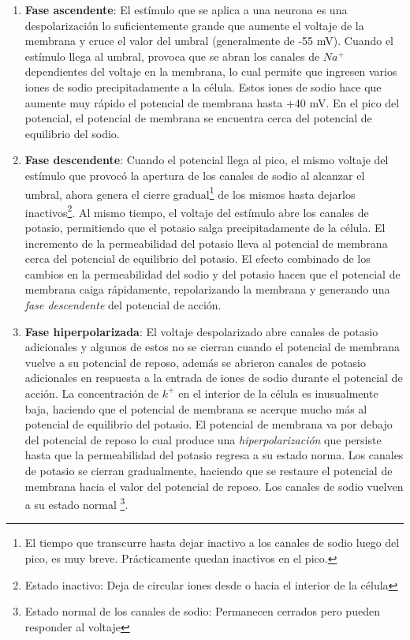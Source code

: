 \begin{enumerate}
\item \textbf{Fase ascendente}: El estímulo que se aplica a una neurona es una despolarización lo suficientemente grande que aumente el voltaje de la membrana y cruce el valor del umbral (generalmente de -55 mV). Cuando el estímulo llega al umbral, provoca que  se abran los canales de $Na^+$ dependientes del voltaje en la membrana, lo cual permite que ingresen varios iones de sodio precipitadamente a la célula. Estos iones de sodio hace que aumente muy rápido el potencial de membrana hasta +40 mV. En el pico del potencial, el potencial de membrana se encuentra cerca del potencial de equilibrio del sodio.
\item \textbf{Fase descendente}: Cuando el potencial llega al pico, el mismo voltaje del estímulo que provocó la apertura de los canales de sodio al alcanzar el umbral, ahora genera el cierre gradual\footnote{\footnotesize El tiempo que transcurre hasta dejar inactivo a los canales de sodio luego del pico, es muy breve. Prácticamente quedan inactivos en el pico.} de los mismos hasta dejarlos inactivos\footnote{\footnotesize Estado inactivo: Deja de circular iones desde o hacia el interior de la célula}. Al mismo tiempo, el voltaje del estímulo abre los canales de potasio, permitiendo que el potasio salga precipitadamente de la célula. El incremento de la permeabilidad del potasio lleva al potencial de membrana cerca del potencial de equilibrio del potasio. El efecto combinado de los cambios en la permeabilidad del sodio y del potasio hacen que el potencial de membrana caiga rápidamente, repolarizando la membrana y generando una \textit{fase descendente} del potencial de acción.
\item \textbf{Fase hiperpolarizada}: El voltaje despolarizado abre canales de potasio adicionales y algunos de estos no se cierran cuando el potencial de membrana vuelve a su potencial de reposo, además se abrieron canales de potasio adicionales en respuesta a la entrada de iones de sodio durante el potencial de acción. La concentración de $k^+$ en el interior de la célula es inusualmente baja, haciendo que el potencial de membrana se acerque mucho más al potencial de equilibrio del potasio. El potencial de membrana va por debajo del potencial de reposo lo cual produce una \textit{hiperpolarización} que persiste hasta que la permeabilidad del potasio regresa a su estado norma. Los canales de potasio se cierran gradualmente, haciendo que se restaure el potencial de membrana hacia el valor del potencial de reposo. Los canales de sodio vuelven a su estado normal \footnote{\footnotesize Estado normal de  los canales de sodio: Permanecen cerrados pero pueden responder al voltaje}.
\end{enumerate}
